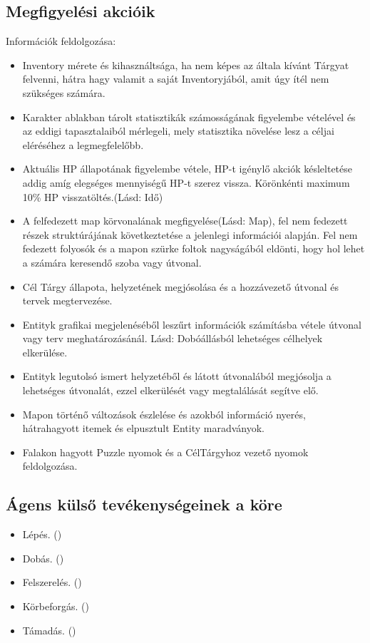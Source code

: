 \subsection{Megfigyelési akcióik}

\noindent Információk feldolgozása:
\begin{itemize}
    \item Inventory mérete és kihasználtsága, ha nem képes az általa kívánt Tárgyat felvenni, hátra hagy valamit a saját Inventoryjából, amit úgy ítél nem szükséges számára.
    \item Karakter ablakban tárolt statisztikák számosságának figyelembe vételével és az eddigi tapasztalaiból mérlegeli, mely statisztika növelése lesz a céljai eléréséhez a legmegfelelőbb.
    \item Aktuális HP állapotának figyelembe vétele, HP-t igénylő akciók késleltetése addig amíg elegséges mennyiségű HP-t szerez vissza. Körönkénti maximum 10\% HP visszatöltés.(Lásd: Idő)
    \item A felfedezett map körvonalának megfigyelése(Lásd: Map), fel nem fedezett részek struktúrájának következtetése a jelenlegi információi alapján. Fel nem fedezett folyosók és a mapon szürke foltok nagyságából eldönti, hogy hol lehet a számára keresendő szoba vagy útvonal.
    \item Cél Tárgy állapota, helyzetének megjósolása és a hozzávezető útvonal és tervek megtervezése.
    \item Entityk grafikai megjelenéséből leszűrt információk számításba vétele útvonal vagy terv meghatározásánál. Lásd: Dobóállásból lehetséges célhelyek elkerülése.
    \item Entityk legutolsó ismert helyzetéből és látott útvonalából megjósolja a lehetséges útvonalát, ezzel elkerülését vagy megtalálását segítve elő.
    \item Mapon történő változások észlelése és azokból információ nyerés, hátrahagyott itemek és elpusztult Entity maradványok.
    \item Falakon hagyott Puzzle nyomok és a CélTárgyhoz vezető nyomok feldolgozása.
\end{itemize}

\subsection{Ágens külső tevékenységeinek a köre}

\begin{itemize}
    \item Lépés. ()
    \item Dobás. ()
    \item Felszerelés. ()
    \item Körbeforgás. ()
    \item Támadás. ()
\end{itemize}

